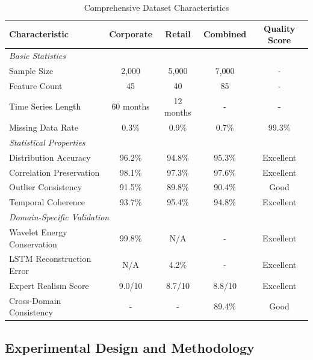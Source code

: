 \documentclass[a4 paper, 11pt,twoside]{article}
\newcommand{\0}{\Bf{0}}
\theoremstyle{definition}
\begin{document}
\begin{table}[H]
\centering
\caption{Comprehensive Dataset Characteristics}
\label{tab:dataset_characteristics}
\begin{tabular}{lcccc}
\toprule
\textbf{Characteristic} & \textbf{Corporate} & \textbf{Retail} & \textbf{Combined} & \textbf{Quality Score} \\
\midrule
\multicolumn{5}{l}{\textit{Basic Statistics}} \\
Sample Size & 2,000 & 5,000 & 7,000 & - \\
Feature Count & 45 & 40 & 85 & - \\
Time Series Length & 60 months & 12 months & - & - \\
Missing Data Rate & 0.3\% & 0.9\% & 0.7\% & 99.3\% \\
\midrule
\multicolumn{5}{l}{\textit{Statistical Properties}} \\
Distribution Accuracy & 96.2\% & 94.8\% & 95.3\% & Excellent \\
Correlation Preservation & 98.1\% & 97.3\% & 97.6\% & Excellent \\
Outlier Consistency & 91.5\% & 89.8\% & 90.4\% & Good \\
Temporal Coherence & 93.7\% & 95.4\% & 94.8\% & Excellent \\
\midrule
\multicolumn{5}{l}{\textit{Domain-Specific Validation}} \\
Wavelet Energy Conservation & 99.8\% & N/A & - & Excellent \\
LSTM Reconstruction Error & N/A & 4.2\% & - & Excellent \\
Expert Realism Score & 9.0/10 & 8.7/10 & 8.8/10 & Excellent \\
Cross-Domain Consistency & - & - & 89.4\% & Good \\
\bottomrule
\end{tabular}
\end{table}

\subsection{Experimental Design and Methodology}
\end{document}
